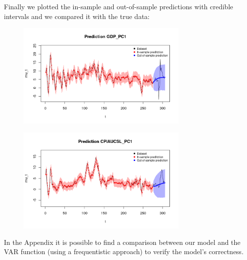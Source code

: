 Finally we plotted the in-sample and out-of-sample predictions with credible intervals and we compared it with the true data: \\  
\begin{figure}[h]
    \centering
    \includegraphics[width=0.75\textwidth]{images/6-VAR/gdp_prediction.png}
    \label{fig:VAR_first}
\end{figure}
\begin{figure}[h]
    \centering
    \includegraphics[width=0.75\textwidth]{images/6-VAR/infl_prediction.png}
    \label{fig:VAR_second}
\end{figure}
In the Appendix it is possible to find a comparison between our model and the VAR function (using a frequentistic approach) to verify the model's correctness.